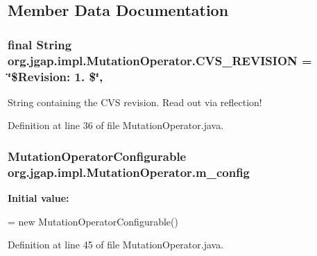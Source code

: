 \subsection{Member Data Documentation}
\hypertarget{classorg_1_1jgap_1_1impl_1_1_mutation_operator_ab837b187fad3cad5dd892f7e3a793847}{
\subsubsection[{C\-V\-S\-\_\-\-R\-E\-V\-I\-S\-I\-O\-N}]{\setlength{\rightskip}{0pt plus 5cm}final String org.\-jgap.\-impl.\-Mutation\-Operator.\-C\-V\-S\-\_\-\-R\-E\-V\-I\-S\-I\-O\-N = \char`\"{}\$Revision\-: 1. \$\char`\"{}\hspace{0.3cm}{\ttfamily [static]}, {\ttfamily [private]}}}\label{classorg_1_1jgap_1_1impl_1_1_mutation_operator_ab837b187fad3cad5dd892f7e3a793847}
String containing the C\-V\-S revision. Read out via reflection! 

Definition at line 36 of file Mutation\-Operator.\-java.

\hypertarget{classorg_1_1jgap_1_1impl_1_1_mutation_operator_a08cdb3d1a82a3fd66aa080043a20b0b2}{
\subsubsection[{m\-\_\-config}]{\setlength{\rightskip}{0pt plus 5cm}Mutation\-Operator\-Configurable org.\-jgap.\-impl.\-Mutation\-Operator.\-m\-\_\-config\hspace{0.3cm}{\ttfamily [private]}}}\label{classorg_1_1jgap_1_1impl_1_1_mutation_operator_a08cdb3d1a82a3fd66aa080043a20b0b2}
{\bfseries Initial value\-:}
\begin{DoxyCode}
= \textcolor{keyword}{new}
      MutationOperatorConfigurable()
\end{DoxyCode}


Definition at line 45 of file Mutation\-Operator.\-java.



